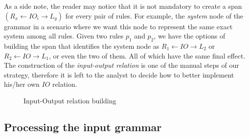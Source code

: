 \begin{example}\label{ex:inout}  

As a side note, the reader may notice that it is not mandatory to create a span \mbox{$\left(R_x \leftarrow IO_i \rightarrow L_y\right)$} for every pair of rules. For example, the \emph{system} node of the grammar in a scenario where we want this node to represent the same exact system among all rules. Given two rules $p_1$ and $p_2$, we have the options of building the span that identifies the system node as
  $R_1 \leftarrow IO \rightarrow L_2$ or $R_2 \leftarrow IO \rightarrow L_1$, or even the two of them. All of which have the same final effect. The construction of the \textit{input-output relation} is one of the manual steps of our strategy, therefore it is left to the analyst to decide how to better implement his/her own $IO$ relation.

\begin{figure}[!ht]
  \centering
  \caption{Input-Output relation building}\label{fig:tests:inout}
\end{figure}

\end{example}

\subsection{Processing the input grammar}


